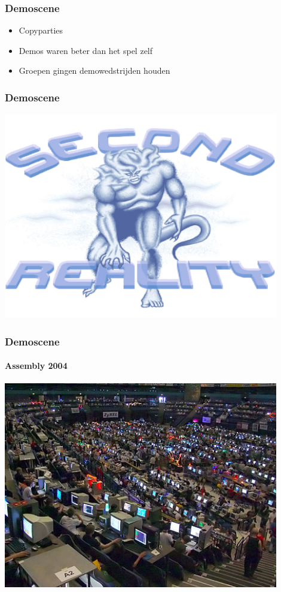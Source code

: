 \documentclass{beamer}
\begin{document}
\begin{frame}
	\frametitle{Demoscene}

	\begin{itemize}
	\item Copyparties
	\item Demos waren beter dan het spel zelf
	\item Groepen gingen demowedstrijden houden
	\end{itemize}
\end{frame}

\begin{frame}
	\frametitle{Demoscene}

	\begin{center}
	\includegraphics[width=0.9\textwidth]{second_reality.png}
	\end{center}
\end{frame}


\begin{frame}
	\frametitle{Demoscene}
	\framesubtitle{Assembly 2004}

	\begin{center}
	\includegraphics[width=0.9\textwidth]{assembly2004.jpg}
	\end{center}
\end{frame}
\end{document}
